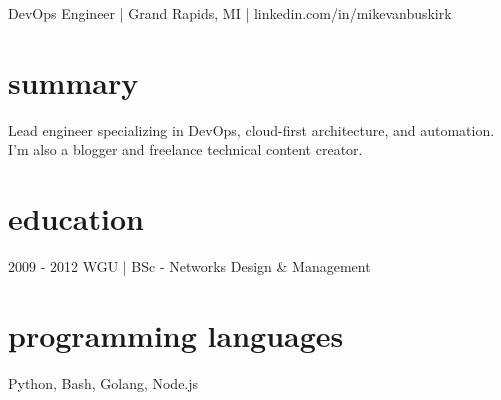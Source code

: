 \documentclass[]{mv_cv}
\begin{document}
       {DevOps Engineer | Grand Rapids, MI | linkedin.com/in/mikevanbuskirk}
 
\section{summary}
\begin{content}
  {
    Lead engineer specializing in DevOps, cloud-first architecture, and automation. I'm also a blogger and freelance technical content creator.
  }
\end{content}

\section{education}
\begin{content}
  {2009 - 2012 WGU | BSc - Networks Design \& Management}
\end{content}

\section{programming languages}
\begin{content}
  {Python, Bash, Golang, Node.js}
\end{content}

\end{document}
